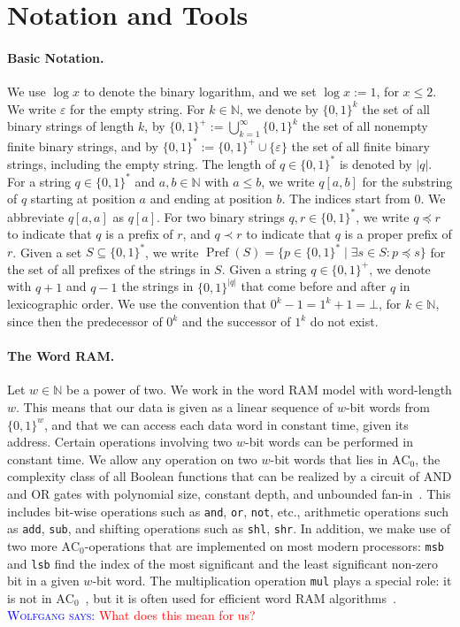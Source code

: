 \documentclass[a4paper,11pt]{article}
\newcommand{\eps}{\varepsilon}
\newcommand{\N}{\mathbb{N}}
\newcommand{\?}{\mskip1.5mu}
\DeclareMathOperator{\Pref}{Pref}
\newcommand{\aremark}[3]{\textcolor{blue}{\textsc{#1 #2:}}
  \textcolor{red}{\textsf{#3}}}
\newcommand{\wolfgang}[2][says]{\aremark{Wolfgang}{#1}{#2}}
\begin{document}
\section{Notation and Tools}
\label{sec:notation}

\paragraph{Basic Notation.}
We use $\log x$ to denote the binary logarithm, and we set 
$\log x := 1$, for $x \leq 2$.
We write $\eps$ for the empty string. For $k \in \N$, we denote by 
$\{0, 1\}^k$ the set of all binary strings of length $k$, by 
$\{0,1\}^+ := \bigcup_{k = 1}^{\infty} \{0, 1\}^k$ the set of all
nonempty finite binary strings, and by 
$\{0,1\}^* := \{0, 1\}^+ \cup \{\eps\}$ the set of all finite binary 
strings, including the empty string. 
The length of $q \in \{0, 1\}^*$ is denoted by $|q|$.
For a string $q \in \{0, 1\}^*$ and $a, b \in \N$ with $a \leq b$, 
we write $q[a, b]$ for the substring of $q$ starting at position
$a$ and ending at position $b$.  The indices start from $0$. 
We abbreviate $q[a, a]$ as $q[a]$. For two binary strings 
$q, r \in \{0,1\}^*$, we write $q \preceq r$ to indicate that $q$ is 
a prefix of $r$, and $q \prec r$ to indicate that $q$ is a proper 
prefix of $r$. 
Given a set $S \subseteq \{0, 1\}^*$, we write 
$\Pref(S) = \{p \in \{0, 1\}^* \mid \exists s \in S: p \preceq s\}$
for the set of all prefixes of the strings in $S$.
Given a string 
$q \in \{0,1\}^+$, we denote with $q + 1$ and $q - 1$ the strings in 
$\{0, 1\}^{|q|}$ that come before and after $q$ in lexicographic 
order. We use the convention that $0^k - 1 = 1^k + 1 = \bot$, for 
$k \in \N$, since then the predecessor of $0^k$ and the successor
of $1^k$ do not exist. 

\paragraph{The Word RAM.}
Let $w \in \N$ be a power of two. We work in the word RAM 
model with word-length $w$. This means that our data is given
as a linear sequence of $w$-bit words from $\{0, 1\}^w$, 
and that we can access each
data word in constant time, given its address. 
Certain operations involving two $w$-bit words
can be performed in constant time.
We allow any operation on two $w$-bit
words that lies in $\text{AC}_0$, the complexity class of
all Boolean functions that can be realized by a 
circuit of AND and OR gates with polynomial size, constant depth,
and unbounded fan-in~\cite{AroraBa09}.
This includes
bit-wise operations such as \texttt{and}, \texttt{or}, 
\texttt{not}, etc., arithmetic operations
such as \texttt{add}, \texttt{sub}, and
shifting operations such as \texttt{shl}, \texttt{shr}.
In addition, we make use of two more $\text{AC}_0$-operations that are 
implemented on most modern processors:
\texttt{msb} and \texttt{lsb} find the index of the
most significant and the least significant non-zero bit
in a given $w$-bit word.
The multiplication operation \texttt{mul} plays a special
role: it is not in $\text{AC}_0$~\cite{FurstSaSi84}, but it is often used
for efficient word RAM algorithms~\cite{FredmanWi93}.
\wolfgang{What does this mean for us?}
\end{document}
